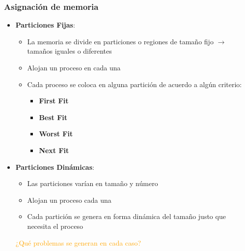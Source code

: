 \begin{frame}
  \frametitle{Asignación de memoria}
  \begin{itemize}
	  \item \textbf{Particiones Fijas}:
	  \begin{itemize}
	  	\item La memoria se divide en particiones o regiones de tamaño fijo $\rightarrow$ tamaños iguales o diferentes
	  	\item Alojan un proceso en cada una
	  	\item Cada proceso se coloca en alguna partición de acuerdo a algún criterio:
	  	\begin{itemize}
	  		\item \textbf{First Fit}
	  		\item \textbf{Best Fit}
	  		\item \textbf{Worst Fit}
	  		\item \textbf{Next Fit}
	  	\end{itemize}
	  \end{itemize}
	  \item \textbf{Particiones Dinámicas}:
	  \begin{itemize}
	  	\item Las particiones varían en tamaño y número
	  	\item Alojan un proceso cada una
	  	\item Cada partición se genera en forma dinámica del tamaño justo que necesita el proceso
	  \end{itemize}

	  \pause
	  \hspace{35pt} \textcolor{orange}{¿Qué problemas se generan en cada caso?}
  \end{itemize}
\end{frame}

